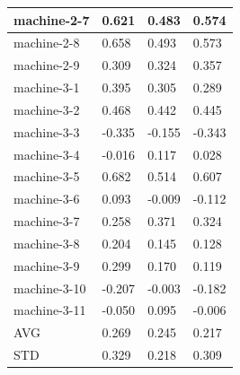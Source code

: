 {\begin{tabular}{|l|l|l|l|}
machine-2-7     & 0.621                                  & 0.483                                 & 0.574                         \\ \hline
machine-2-8     & 0.658                                  & 0.493                                 & 0.573                         \\ \hline
machine-2-9     & 0.309                                  & 0.324                                 & 0.357                         \\ \hline
machine-3-1     & 0.395                                  & 0.305                                 & 0.289                         \\ \hline
machine-3-2     & 0.468                                  & 0.442                                 & 0.445                         \\ \hline
machine-3-3     & -0.335                                 & -0.155                                & -0.343                        \\ \hline
machine-3-4     & -0.016                                 & 0.117                                 & 0.028                         \\ \hline
machine-3-5     & 0.682                                  & 0.514                                 & 0.607                         \\ \hline
machine-3-6     & 0.093                                  & -0.009                                & -0.112                        \\ \hline
machine-3-7     & 0.258                                  & 0.371                                 & 0.324                         \\ \hline
machine-3-8     & 0.204                                  & 0.145                                 & 0.128                         \\ \hline
machine-3-9     & 0.299                                  & 0.170                                 & 0.119                         \\ \hline
machine-3-10    & -0.207                                 & -0.003                                & -0.182                        \\ \hline
machine-3-11    & -0.050                                 & 0.095                                 & -0.006                        \\ \hline
AVG             & 0.269                                  & 0.245                                 & 0.217                         \\ \hline
STD             & 0.329                                  & 0.218                                 & 0.309                         \\ \hline
\end{tabular}%
}


